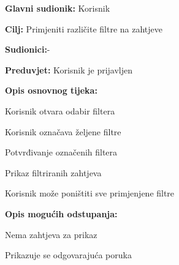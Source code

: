 				
				\noindent {}
				\begin{packed_item}
					
					\item \textbf{Glavni sudionik: }Korisnik
					\item  \textbf{Cilj:} Primjeniti različite filtre na zahtjeve
					\item  \textbf{Sudionici:}-
					\item  \textbf{Preduvjet:} Korisnik je prijavljen
					\item  \textbf{Opis osnovnog tijeka:}
					
					\item[] \begin{packed_enum}
						
						\item Korisnik otvara odabir filtera
						\item Korisnik označava željene filtre
						\item Potvrđivanje označenih filtera
						\item Prikaz filtriranih zahtjeva 
						\item Korisnik može poništiti sve primjenjene filtre
					\end{packed_enum}
					
					\item  \textbf{Opis mogućih odstupanja:}
					
					\item[] \begin{packed_item}
						
						\item[4.a] Nema zahtjeva za prikaz
						\item[] \begin{packed_enum}
							
							\item Prikazuje se odgovarajuća poruka
							
						\end{packed_enum}
						
						
					\end{packed_item}
				\end{packed_item}
			
